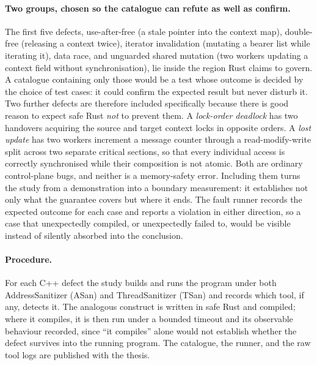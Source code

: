 \documentclass[english,twoside,openright,a4paper,censored,csm,software-track-2020]{HYthesisML}
\begin{document}
\paragraph{Two groups, chosen so the catalogue can refute as well as confirm.}
The first five defects, use-after-free (a stale pointer into the context map), double-free
(releasing a context twice), iterator invalidation (mutating a bearer list while iterating
it), data race, and unguarded shared mutation (two workers updating a context field without
synchronisation), lie inside the region Rust claims to govern. A catalogue containing only
those would be a test whose outcome is decided by the choice of test cases: it could confirm
the expected result but never disturb it. Two further defects are therefore included
specifically because there is good reason to expect safe Rust \emph{not} to prevent them. A
\emph{lock-order deadlock} has two handovers acquiring the source and target context locks in
opposite orders. A \emph{lost update} has two workers increment a message counter through a
read-modify-write split across two separate critical sections, so that every individual access
is correctly synchronised while their composition is not atomic. Both are ordinary
control-plane bugs, and neither is a memory-safety error. Including them turns the study from a
demonstration into a boundary measurement: it establishes not only what the guarantee covers
but where it ends. The fault runner records the expected outcome for each case and reports a
violation in either direction, so a case that unexpectedly compiled, or unexpectedly failed to,
would be visible instead of silently absorbed into the conclusion.

\paragraph{Procedure.}
For each C++ defect the study builds and runs the program under both AddressSanitizer (ASan)
and ThreadSanitizer (TSan) and records which tool, if any, detects it. The analogous construct
is written in safe Rust and compiled; where it compiles, it is then run under a bounded timeout
and its observable behaviour recorded, since ``it compiles'' alone would not establish whether
the defect survives into the running program. The catalogue, the runner, and the raw tool logs
are published with the thesis.
\end{document}
